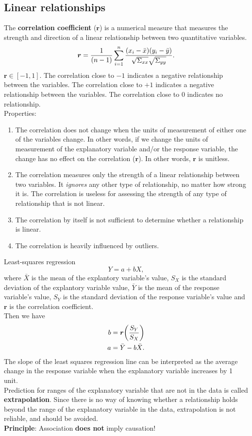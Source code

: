 \documentclass[10pt, a4paper]{article}
\begin{document}
\subsection{Linear relationships}
The \textbf{correlation coefficient} ($\bm{r}$) is a numerical measure that measures the strength and direction of a linear relationship between two quantitative variables.
\begin{equation}
    \bm{r}={1\over (n-1)}\sum_{i=1}^n 
    \frac{(x_i-\bar{x})(y_i-\bar{y})}
    {\sqrt{\Sigma_{xx}}\sqrt{\Sigma_{yy}}}.
\end{equation}
$\bm{r}\in [-1,1]$. The correlation close to $-1$ indicates a negative relationship between the variables. The correlation close to $+1$ indicates a negative relationship between the variables. The correlation close to $0$ indicates no relationship.\\
Properties:
\begin{enumerate}
\item The correlation does not change when the units of measurement of either one of the variables change. In other words, if we change the units of measurement of the explanatory variable and/or the response variable, the change has no effect on the correlation ($\bm{r}$). In other words, $\bm{r}$ is unitless. 
\item The correlation measures only the strength of a linear relationship between two variables. It \emph{ignores} any other type of relationship, no matter how strong it is. The correlation is useless for assessing the strength of any type of relationship that is not linear.
\item The correlation by itself is not sufficient to determine whether a relationship is linear.
\item The correlation is heavily influenced by outliers.
\end{enumerate}
Least-squares regression
\begin{equation}
Y = a+bX,
\end{equation}
where $\bar{X}$ is the mean of the explantory variable's value, $S_X$ is the standard deviation of the explantory variable value, $\bar{Y}$ is the mean of the response variable's value, $S_Y$ is the standard deviation of the response variable's value and $\bm{r}$ is the correlation coefficient.\\
Then we have 
\begin{align}
  b&=\bm{r}\bigg({S_Y \over S_X}\bigg)\\
  a&=\bar{Y}-b\bar{X}.
\end{align}
The slope of the least squares regression line can be interpreted as the average change in the response variable when the explanatory variable increases by 1 unit.\\
Prediction for ranges of the explanatory variable that are not in the data is called \textbf{extrapolation}. Since there is no way of knowing whether a relationship holds beyond the range of the explanatory variable in the data, extrapolation is not reliable, and should be avoided.\\
\textbf{Principle}: Association \textbf{does not} imply causation!
\end{document}
